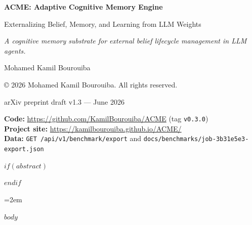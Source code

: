\documentclass[11pt,a4paper]{article}
\newcommand{\papertagline}{A cognitive memory substrate for external belief lifecycle management in LLM agents.}
\begin{document}



\begin{center}
  \vspace*{0.12in}
  {\sffamily\fontsize{24}{29}\selectfont\bfseries
   ACME: Adaptive Cognitive Memory Engine\par}
  \vspace{0.85em}
  {\sffamily\Large
   Externalizing Belief, Memory, and Learning from LLM Weights\par}
  \vspace{1.1em}
  {\normalsize\itshape\papertagline\par}
  \vspace{1.15em}
  {\normalsize Mohamed Kamil Bourouiba\par}
  \vspace{0.35em}
  {\footnotesize\copyright{} 2026 Mohamed Kamil Bourouiba. All rights reserved.\par}
  \vspace{0.45em}
  {\small arXiv preprint draft v1.3 --- June 2026\par}
  \vspace{0.85em}
  \acmeTitleStrip
  \vspace{0.65em}
  \begin{metabox}
    \begin{minipage}{0.88\linewidth}
      \footnotesize\sffamily\color{acmefiggray}
      \textbf{Code:} \url{https://github.com/KamilBourouiba/ACME} (tag \texttt{v0.3.0})\\
      \textbf{Project site:} \url{https://kamilbourouiba.github.io/ACME/}\\
      \textbf{Data:} \texttt{GET /api/v1/benchmark/export} and \texttt{docs/benchmarks/job-3b31e5e3-export.json}
    \end{minipage}
  \end{metabox}
  \vspace{0.75em}
\end{center}

$if(abstract)$
\begin{abstract}
$abstract$
\end{abstract}
$endif$

\twocolumn
\raggedbottom
\emergencystretch=2em

$body$
\end{document}
